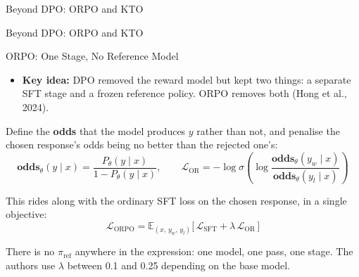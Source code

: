 \begin{frame}{Beyond DPO: ORPO and KTO}
  \begin{center}
    \Large
    Beyond DPO: ORPO and KTO
  \end{center}
\end{frame}

\begin{frame}[t]{ORPO: One Stage, No Reference Model}
  \begin{itemize}
    \item[\textcolor{red}{$\blacktriangleright$}] \textbf{Key idea:} DPO removed the reward model but kept two things: a separate SFT stage and a frozen reference policy. ORPO removes both (Hong et al., 2024).
  \end{itemize}

  \vspace{0.3em}
  Define the \textbf{odds} that the model produces $y$ rather than not, and penalise the chosen response's odds being no better than the rejected one's:
  \[
    \mathbf{odds}_\theta(y \mid x) = \frac{P_\theta(y \mid x)}{1 - P_\theta(y \mid x)},
    \qquad
    \mathcal{L}_{\mathrm{OR}} = -\log \sigma\!\left(\log \frac{\mathbf{odds}_\theta(y_w \mid x)}{\mathbf{odds}_\theta(y_l \mid x)}\right)
  \]

  This rides along with the ordinary SFT loss on the chosen response, in a single objective:
  \[
    \mathcal{L}_{\mathrm{ORPO}} = \mathbb{E}_{(x,\,y_w,\,y_l)}\big[\,\mathcal{L}_{\mathrm{SFT}} + \lambda\,\mathcal{L}_{\mathrm{OR}}\,\big]
  \]

  \footnotesize
  There is no $\pi_{\text{ref}}$ anywhere in the expression: one model, one pass, one stage. The authors use $\lambda$ between 0.1 and 0.25 depending on the base model.
\end{frame}

